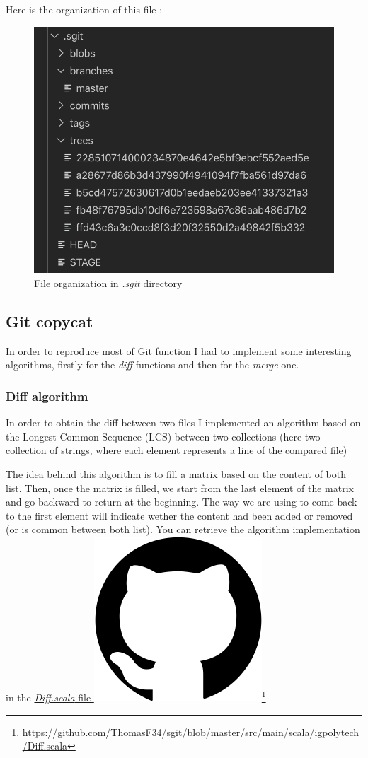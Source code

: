 \documentclass[11pt]{article}
\begin{document}
Here is the organization of this file :
\begin{figure}[h!]
  \centering
  \includegraphics[width=0.5\linewidth]{img/fileOrganisation.png}
  \caption{File organization in \textit{.sgit} directory}
\end{figure}

\subsection{Git copycat}

In order to reproduce most of Git function I had to implement some interesting algorithms, firstly for the \textit{diff} functions and then for the \textit{merge} one.

\subsubsection{Diff algorithm}
In order to obtain the diff between two files I implemented an algorithm based on the Longest Common Sequence (LCS) between two collections (here two collection of strings, where each element represents a line of the compared file)

The idea behind this algorithm is to fill a matrix based on the content of both list. Then, once the matrix is filled, we start from the last element of the matrix and go backward to return at the beginning. The way we are using to come back to the first element will indicate wether the content had been added or removed (or is common between both list). You can retrieve the algorithm implementation in the \href{https://github.com/ThomasF34/sgit/blob/master/src/main/scala/igpolytech/Diff.scala}{\textit{Diff.scala} file \includegraphics[height=\fontcharht\font`\l]{img/github.png}}\footnote{\href{https://github.com/ThomasF34/sgit/blob/master/src/main/scala/igpolytech/Diff.scala}{\ul{https://github.com/ThomasF34/sgit/blob/master/src/main/scala/igpolytech/Diff.scala}}}
\end{document}
